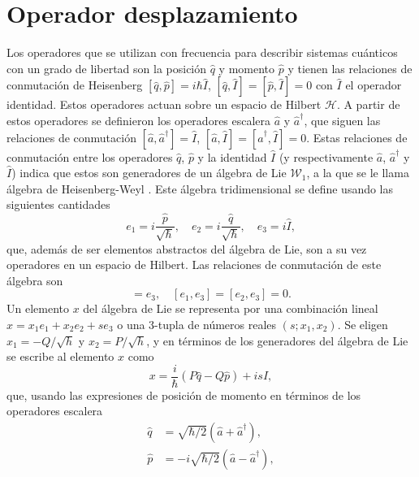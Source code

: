 \section{Operador desplazamiento}
Los operadores que se utilizan con frecuencia para describir sistemas cuánticos con un grado de libertad son la posición $\hat{q}$ y momento $\hat{p}$ y tienen las relaciones de conmutación de Heisenberg $[\hat{q}, \hat{p}] = i\hbar \hat{I}$, $[\hat{q}, \hat{I}] = [\hat{p}, \hat{I}]=0$ con $\hat{I}$ el operador identidad. Estos operadores actuan sobre un espacio de Hilbert $\mathcal{H}$. A partir de estos operadores se definieron los operadores escalera $\hat{a}$ y $\hat{a}^{\dagger}$, que siguen las relaciones de conmutación $[\hat{a}, \hat{a}^{\dagger}] = \hat{I}$, $[\hat{a}, \hat{I}]=[\hat{a}^{\dagger}, \hat{I}] = 0$. Estas relaciones de conmutación entre los operadores $\hat{q}$, $\hat{p}$ y la identidad $\hat{I}$ (y respectivamente $\hat{a}$, $\hat{a}^{\dagger}$ y $\hat{I}$) indica que estos son generadores de un álgebra de Lie $\mathcal{W}_1$, a la que se le llama álgebra de Heisenberg-Weyl \cite{Perelomov}. Este álgebra tridimensional se define usando las siguientes cantidades
\begin{equation*}
  e_1 = i\frac{\hat{p}}{\sqrt{\hbar}}, \quad e_2 = i\frac{\hat{q}}{\sqrt{\hbar}}, \quad e_3 = i\hat{I},
\end{equation*}
que, además de ser elementos abstractos del álgebra de Lie, son a su vez operadores en un espacio de Hilbert. Las relaciones de conmutación de este álgebra son
\begin{equation*}
  [e_1, e_2] = e_3, \quad [e_1, e_3] = [e_2, e_3] = 0.
\end{equation*}
Un elemento $x$ del álgebra de Lie se representa por una combinación lineal $x = x_1e_1 + x_2e_2 + s e_3$ o una 3-tupla de números reales $(s;x_1,x_2)$. Se eligen $x_1 = -Q/\sqrt{h}$ y $x_2 = P/\sqrt{h}$, y en términos de los generadores del álgebra de Lie se escribe al elemento $x$ como
\begin{equation}\label{eq:C3_combinacion_lineal}
  x = \frac{i}{\hbar}(P\hat{q} - Q\hat{p}) + is\hat{I},
\end{equation}
que, usando las expresiones de posición de momento en términos de los operadores escalera
\begin{align}
  \hat{q} & = \sqrt{\hbar/2}(\hat{a} + \hat{a}^{\dagger}) \label{eq:C3_op_posicion_esc},  \\
  \hat{p} & = -i\sqrt{\hbar/2}(\hat{a} - \hat{a}^{\dagger}) \label{eq:C3_op_momento_esc},
\end{align}
